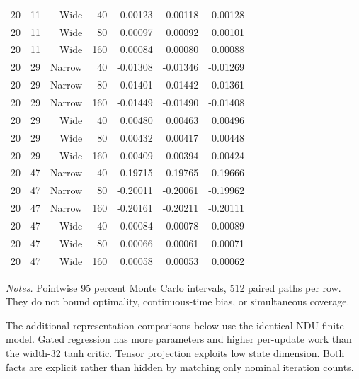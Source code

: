\documentclass[ecta,nameyear,draft]{econsocart}
\theoremstyle{definition}
\theoremstyle{remark}
\begin{document}
\begin{small}
\begin{longtable}{lrrrrrr}
20 & 11 & Wide & 40 & 0.00123 & 0.00118 & 0.00128 \\
20 & 11 & Wide & 80 & 0.00097 & 0.00092 & 0.00101 \\
20 & 11 & Wide & 160 & 0.00084 & 0.00080 & 0.00088 \\
20 & 29 & Narrow & 40 & -0.01308 & -0.01346 & -0.01269 \\
20 & 29 & Narrow & 80 & -0.01401 & -0.01442 & -0.01361 \\
20 & 29 & Narrow & 160 & -0.01449 & -0.01490 & -0.01408 \\
20 & 29 & Wide & 40 & 0.00480 & 0.00463 & 0.00496 \\
20 & 29 & Wide & 80 & 0.00432 & 0.00417 & 0.00448 \\
20 & 29 & Wide & 160 & 0.00409 & 0.00394 & 0.00424 \\
20 & 47 & Narrow & 40 & -0.19715 & -0.19765 & -0.19666 \\
20 & 47 & Narrow & 80 & -0.20011 & -0.20061 & -0.19962 \\
20 & 47 & Narrow & 160 & -0.20161 & -0.20211 & -0.20111 \\
20 & 47 & Wide & 40 & 0.00084 & 0.00078 & 0.00089 \\
20 & 47 & Wide & 80 & 0.00066 & 0.00061 & 0.00071 \\
20 & 47 & Wide & 160 & 0.00058 & 0.00053 & 0.00062 \\
\bottomrule\end{longtable}\end{small}
\noindent\textit{Notes.} Pointwise 95 percent Monte Carlo intervals, 512 paired paths per row. They do not bound optimality, continuous-time bias, or simultaneous coverage.


The additional representation comparisons below use the identical NDU finite model. Gated regression has more parameters and higher per-update work than the width-32 tanh critic. Tensor projection exploits low state dimension. Both facts are explicit rather than hidden by matching only nominal iteration counts.
\end{document}
